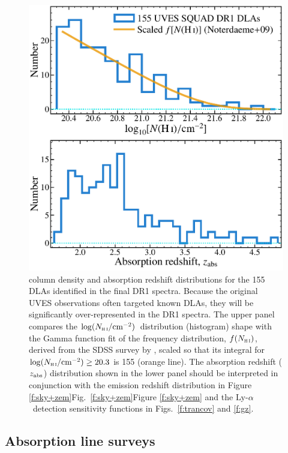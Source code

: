 \documentclass[fleqn,usenatbib,usedcolumn]{mnras}
\newcommand{\Fref}[1]{\ifhmode \ifnum\spacefactor=1001 Figure \ref{#1}\else Fig.\ \ref{#1}\fi \else Figure \ref{#1}\fi}
\newcommand{\lya}{\ensuremath{\textrm{Ly-}\alpha}}
\newcommand{\zab}{\ensuremath{z_\textrm{\scriptsize abs}}}
\newcommand{\NHI}{\ensuremath{N_\textsc{h\scriptsize{\,i}}}}
\newcommand{\lNHI}{\ensuremath{\log(N_\textsc{h\scriptsize{\,i}}/\textrm{cm}^{-2})}}
\begin{document}
\begin{figure}
\begin{center}
\includegraphics[width=0.95\columnwidth]{DR1_DLAdists.pdf}
\vspace{-1em}
\caption{ column density and absorption redshift distributions for the 155 DLAs identified in the final DR1 spectra. Because the original UVES observations often targeted known DLAs, they will be significantly over-represented in the DR1 spectra. The upper panel compares the \lNHI\ distribution (histogram) shape with the Gamma function fit of the frequency distribution, $f(\NHI)$, derived from the SDSS survey by \citet{Noterdaeme:2009:1087}, scaled so that its integral for $\lNHI\ge20.3$ is 155 (orange line). The absorption redshift (\zab) distribution shown in the lower panel should be interpreted in conjunction with the emission redshift distribution in \Fref{f:sky+zem} and the \lya\ detection sensitivity functions in Figs.\ \ref{f:trancov} and \ref{f:gz}.}
\label{f:DLAdists}
\end{center}
\end{figure}


\subsection{Absorption line surveys}\label{ss:surveys}
\end{document}
